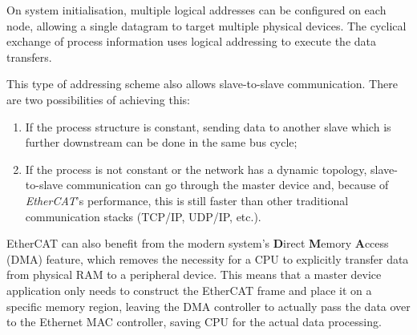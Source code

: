 On system initialisation, multiple logical addresses can be configured on each node, allowing a single datagram to target multiple physical devices.
The cyclical exchange of process information uses logical addressing to execute the data transfers.

This type of addressing scheme also allows slave-to-slave communication.
There are two possibilities of achieving this:
\begin{enumerate}
	\item If the process structure is constant, sending data to another slave which is further downstream can be done in the same bus cycle;
	\item If the process is not constant or the network has a dynamic topology, slave-to-slave communication can go through the master device and, because of \emph{EtherCAT}'s performance, this is still faster than other traditional communication stacks (TCP/IP, UDP/IP, etc.).
\end{enumerate}

EtherCAT can also benefit from the modern system's \textbf Direct \textbf Memory \textbf Access (DMA) feature, which removes the necessity for a CPU to explicitly transfer data from physical RAM to a peripheral device.
This means that a master device application only needs to construct the EtherCAT frame and place it on a specific memory region, leaving the DMA controller to actually pass the data over to the Ethernet MAC controller, saving CPU for the actual data processing.
